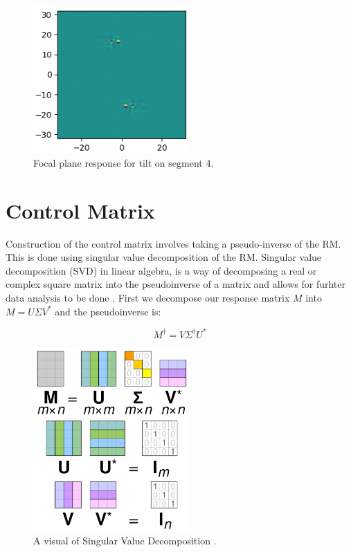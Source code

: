 \begin{figure}[H]
    \centering
    \includegraphics[width = 6cm]{Figures/I_diff.png}
    \caption{Focal plane response for tilt on segment 4.}
    \label{fig:I_diff}
\end{figure}



\section{Control Matrix}
\label{sec:CM}

Construction of the control matrix involves taking a pseudo-inverse of the RM.  This is done using singular value
decomposition of the RM.  Singular value decomposition (SVD) in linear algebra, is a way of decomposing a real or
complex square matrix into the pseudoinverse of a matrix and allows for furhter data analysis to be done \cite{Hestenes1958InversionResults}.  First we decompose
our response matrix $M$ into $M = U \Sigma V^{\ast}$ and the pseudoinverse is:

\begin{equation}
    M^{\dagger} = V \Sigma^{\dagger} U^{\ast}
    \label{eq:SVD}
\end{equation}

\begin{figure}[H]
    \centering
    \includegraphics[width = 6cm]{Figures/Singular_value_decomposition_visualisation.jpg}
    \caption{A visual of Singular Value Decomposition \cite{Hestenes1958InversionResults}.}
    \label{fig:SVD}
\end{figure}

